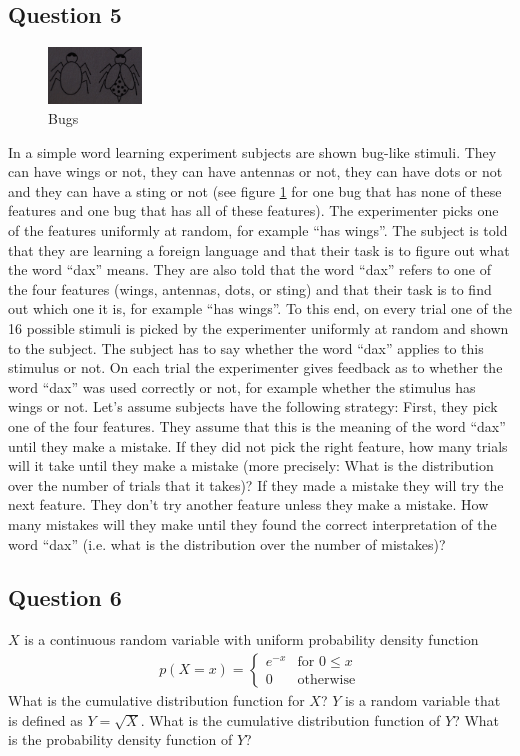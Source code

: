 \subsection*{Question 5}
\begin{figure}[b]
  \centering
  \includegraphics[width=2.5cm]{images/bugs.jpg}
  \caption{Bugs}
  \label{fig:midterm_bugpic}
\end{figure}
In a simple word learning experiment subjects are shown bug-like stimuli. They can have wings or not, they can have antennas or not, they can have dots or not and they can have a sting or not (see figure \ref{fig:midterm_bugpic} for one bug that has none of these features and one bug that has all of these features). The experimenter picks one of the features uniformly at random, for example ``has wings''. The subject is told that they are learning a foreign language and that their task is to figure out what the word ``dax'' means. They are also told that the word ``dax'' refers to one of the four features (wings, antennas, dots, or sting) and that their task is to find out which one it is, for example ``has wings''. To this end, on every trial one of the 16 possible stimuli is picked by the experimenter uniformly at random and shown to the subject. The subject has to say whether the word ``dax'' applies to this stimulus or not. On each trial the experimenter gives feedback as to whether the word ``dax'' was used correctly or not, for example whether the stimulus has wings or not. Let's assume subjects have the following strategy: First, they pick one of the four features. They assume that this is the meaning of the word ``dax'' until they make a mistake. If they did not pick the right feature, how many trials will it take until they make a mistake (more precisely: What is the distribution over the number of trials that it takes)? If they made a mistake they will try the next feature. They don't try another feature unless they make a mistake. How many mistakes will they make until they found the correct interpretation of the word ``dax'' (i.e. what is the distribution over the number of mistakes)?

\subsection*{Question 6}
$X$ is a continuous random variable with uniform probability density function
\begin{align*}
p(X=x)=\begin{cases}
e^{-x} &\text{for } 0 \leq x \\
0 & \text{otherwise}
\end{cases}
\end{align*}
What is the cumulative distribution function for $X$? $Y$ is a random variable that is defined as $Y=\sqrt{X}$. What is the cumulative distribution function of $Y$? What is the probability density function of $Y$?

